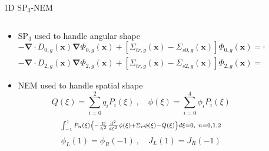 \begin{frame}[t]{1D SP$_3$-NEM}
    
    \begin{columns}
      \begin{column}{0.6\textwidth}
        \begin{itemize}
          \item SP$_3$ \cite{SPnEquations} used to handle angular shape 
          \begin{dmath*}\scriptstyle
            {-\bm{\nabla} \cdot D_{0,g} \left(\bm x\right) \bm \nabla 
            \Phi_{0,g}\left(\bm x\right) + \left[\Sigma_{tr,g}\left(\bm 
            x\right) - \Sigma_{s0,g}\left(\bm 
            x\right)\right]\Phi_{0,g}\left(\bm x\right)} = {Q_g\left(\bm 
            x\right) + 2\left[\Sigma_{tr,g}\left(\bm x\right) - 
            \Sigma_{s0,g}\left(\bm x\right)\right]\Phi_{2,g}\left(\bm 
            x\right)}
          \end{dmath*}
          \begin{dmath*}\scriptstyle
            {-\bm{\nabla} \cdot D_{2,g} \left(\bm x\right) \bm \nabla 
            \Phi_{2,g}\left(\bm x\right) + \left[\Sigma_{tr,g}\left(\bm 
            x\right) - \Sigma_{s2,g}\left(\bm 
            x\right)\right]\Phi_{2,g}\left(\bm x\right)} = 
            {\frac{2}{5}\left\lbrace \left[\Sigma_{tr,g}\left(\bm x\right) - 
            \Sigma_{s0,g}\left(\bm x\right)\right]\left[\Phi_{0,g}\left(\bm 
            x\right) - 2\Phi_{2,g}\left(\bm x\right)\right] - Q_g\left(\bm 
            x\right) \right\rbrace}
          \end{dmath*}
          \item NEM \cite{finnemann1977RodCuspingOrigMention} used to handle spatial shape
          \begin{equation*}\scriptstyle
          Q\left(\xi\right) = \sum_{i=0}^2 q_i P_i\left(\xi\right)\ , \quad 
          \phi\left(\xi\right) = \sum_{i=0}^4 \phi_i P_i\left(\xi\right)
          \end{equation*}
          \begin{equation*}\scriptstyle
          \intop_{-1}^1 P_n\left(\xi\right) 
          \left(-\frac{D}{h^2}\frac{d^2}{d\xi^2}\phi\left(\xi\right) + \Sigma_r 
          \phi\left(\xi\right) - Q\left(\xi\right)\right)d\xi = 0,\ n=0,1,2
          \end{equation*}
          \begin{equation*}\scriptstyle
          \phi_L\left(1\right) = \phi_R\left(-1\right)\ , \quad 
          J_L\left(1\right) = J_R\left(-1\right)
          \end{equation*}
        \end{itemize}
      \end{column}
    \begin{column}{0.4\textwidth}
      \begin{figure}[h]
        \centering
        \resizebox{!}{0.5\textheight}{}
      \end{figure}
    \end{column}
    \end{columns}
    
\end{frame}

